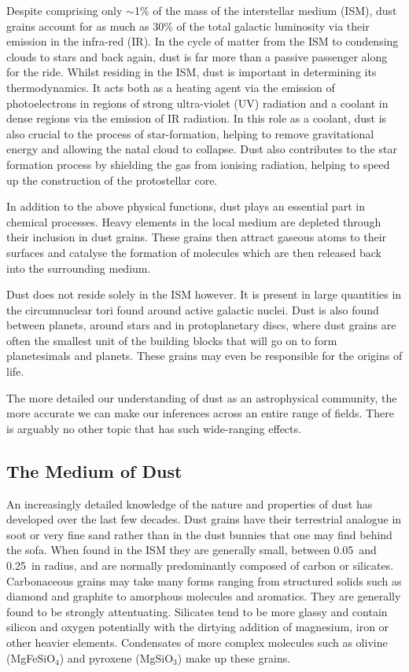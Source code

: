 Despite comprising only $\sim$1\% of the mass of the interstellar medium (ISM), dust grains account for as much as 30\% of the total galactic luminosity via their emission in the infra-red (IR).  In the cycle of matter from the ISM to condensing clouds to stars and back again, dust is far more than a passive passenger along for the ride.  Whilst residing in the ISM, dust is important in determining its thermodynamics.  It acts both as a heating agent via the emission of photoelectrons in regions of strong ultra-violet (UV) radiation and a coolant in dense regions via the emission of IR radiation.  In this role as a coolant, dust is also crucial to the process of star-formation, helping to remove gravitational energy and allowing the natal cloud to collapse.  Dust also contributes to the star formation process by shielding the gas from ionising radiation, helping to speed up the construction of the protostellar core. 

In addition to the above physical functions, dust plays an essential part in chemical processes.  Heavy elements in the local medium are depleted through their inclusion in dust grains.  These grains then attract gaseous atoms to their surfaces and catalyse the formation of molecules which are then released back into the surrounding medium.

Dust does not reside solely in the ISM however.  It is present in  large quantities in the circumnuclear tori found around active galactic nuclei.  Dust is also found between planets, around stars and in protoplanetary discs, where dust grains are often the smallest unit of the building blocks that will go on to form planetesimals and planets.  These grains may even be responsible for the origins of life.  

The more detailed our understanding of dust as an astrophysical community, the more accurate we can make our inferences across an entire range of  fields.  There is arguably no other topic that has such wide-ranging effects.


\subsection{The Medium of Dust}

An increasingly detailed knowledge of the nature and properties of dust has developed over the last few decades. Dust grains have their terrestrial analogue in soot or very fine sand rather than in the dust bunnies that one may find behind the sofa.  When found in the ISM they are generally small, between 0.05\micron\ and 0.25\micron\ in radius, and are normally predominantly composed of carbon or silicates.  Carbonaceous grains may take many forms ranging from structured solids such as diamond and graphite to amorphous molecules and aromatics.  They are generally found to be strongly attentuating.  Silicates tend to be more glassy and contain silicon and oxygen potentially with the dirtying addition of magnesium, iron or other heavier elements.  Condensates of more complex molecules such as olivine (MgFeSiO$_4$) and pyroxene (MgSiO$_3$) make up these grains.  

